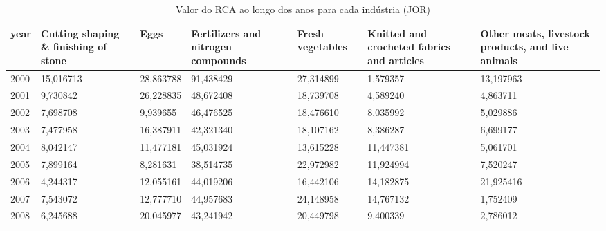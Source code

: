 \begin{table}
\centering
\caption{Valor do RCA ao longo dos anos para cada indústria (JOR)}
\begin{tabular}{p{1cm}p{2cm}p{2cm}p{2cm}p{2cm}p{2cm}p{2cm}}
\toprule
 year &  Cutting shaping \& finishing of stone &      Eggs &  Fertilizers and nitrogen compounds &  Fresh vegetables &  Knitted and crocheted fabrics and articles &  Other meats, livestock products, and live animals \\
\midrule
 2000 &                             15,016713 & 28,863788 &                           91,438429 &         27,314899 &                                    1,579357 &                                          13,197963 \\
 2001 &                              9,730842 & 26,228835 &                           48,672408 &         18,739708 &                                    4,589240 &                                           4,863711 \\
 2002 &                              7,698708 &  9,939655 &                           46,476525 &         18,476610 &                                    8,035992 &                                           5,029886 \\
 2003 &                              7,477958 & 16,387911 &                           42,321340 &         18,107162 &                                    8,386287 &                                           6,699177 \\
 2004 &                              8,042147 & 11,477181 &                           45,031924 &         13,615228 &                                   11,447381 &                                           5,061701 \\
 2005 &                              7,899164 &  8,281631 &                           38,514735 &         22,972982 &                                   11,924994 &                                           7,520247 \\
 2006 &                              4,244317 & 12,055161 &                           44,019206 &         16,442106 &                                   14,182875 &                                          21,925416 \\
 2007 &                              7,543072 & 12,777710 &                           44,957683 &         24,148958 &                                   14,767132 &                                           1,752409 \\
 2008 &                              6,245688 & 20,045977 &                           43,241942 &         20,449798 &                                    9,400339 &                                           2,786012 \\

\end{tabular}
\end{table}
